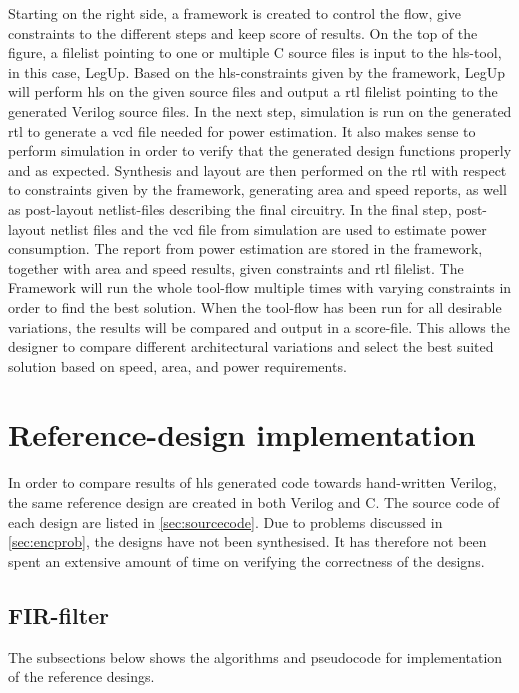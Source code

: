Starting on the right side, a framework is created to control the flow, give constraints to the different steps and keep score of results. On the top of the figure, a filelist pointing to one or multiple C source files is input to the \gls{hls}-tool, in this case, LegUp. Based on the \gls{hls}-constraints given by the framework, LegUp will perform \gls{hls} on the given source files and output a \gls{rtl} filelist pointing to the generated Verilog source files. In the next step, simulation is run on the generated \gls{rtl} to generate a \gls{vcd} file needed for power estimation. It also makes sense to perform simulation in order to verify that the generated design functions properly and as expected. Synthesis and layout are then performed on the \gls{rtl} with respect to constraints given by the framework, generating area and speed reports, as well as post-layout netlist-files describing the final circuitry. In the final step, post-layout netlist files and the \gls{vcd} file from simulation are used to estimate power consumption. The report from power estimation are stored in the framework, together with area and speed results, given constraints and \gls{rtl} filelist. The Framework will run the whole tool-flow multiple times with varying constraints in order to find the best solution. When the tool-flow has been run for all desirable variations, the results will be compared and output in a score-file. This allows the designer to compare different architectural variations and select the best suited solution based on speed, area, and power requirements.

\section{Reference-design implementation}
In order to compare results of \gls{hls} generated code towards hand-written Verilog, the same reference design are created in both Verilog and C. The source code of each design are listed in \cref{sec:sourcecode}. Due to problems discussed in \cref{sec:encprob}, the designs have not been synthesised. It has therefore not been spent an extensive amount of time on verifying the correctness of the designs.
\subsection{FIR-filter}

The subsections below shows the algorithms and pseudocode for implementation of the reference desings.

